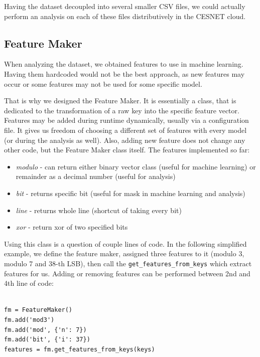 Having the dataset decoupled into several smaller CSV files, we could actually perform an analysis on each of these files distributively in the CESNET cloud.

\subsection*{Feature Maker}

\label{feature-maker}

When analyzing the dataset, we obtained features to use in machine learning. Having them hardcoded would not be the best approach, as new features may occur or some features may not be used for some specific model. 

That is why we designed the Feature Maker. It is essentially a class, that is dedicated to the transformation of a raw key into the specific feature vector. Features may be added during runtime dynamically, usually via a configuration file. It gives us freedom of choosing a different set of features with every model (or during the analysis as well). Also, adding new feature does not change any other code, but the Feature Maker class itself. The features implemented so far:

\begin{itemize}

\item \textit{modulo} - can return either binary vector class (useful for machine learning) or remainder as a decimal number (useful for analysis)
\item \textit{bit} - returns specific bit (useful for mask in machine learning and analysis)
\item \textit{line} - returns whole line (shortcut of taking every bit)
\item \textit{xor} - return xor of two specified bits

\end{itemize}

\noindent
Using this class is a question of couple lines of code. In the following simplified example, we define the feature maker, assigned three features to it (modulo 3, modulo 7 and 38-th LSB), then call the \texttt{get\_features\_from\_keys} which extract features for us. Adding or removing features can be performed between 2nd and 4th line of code:

\begin{verbatim}

fm = FeatureMaker()
fm.add('mod3')
fm.add('mod', {'n': 7})
fm.add('bit', {'i': 37})
features = fm.get_features_from_keys(keys)

\end{verbatim}

